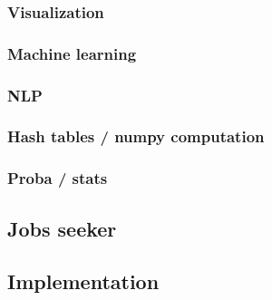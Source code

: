 \documentclass[11pt]{article}
\begin{document}
\subsubsection{Visualization}
\label{sec:org43c0b10}
\subsubsection{Machine learning}
\label{sec:orgefc3432}
\subsubsection{NLP}
\label{sec:org922ff11}
\subsubsection{Hash tables / numpy computation}
\label{sec:org3afe8b7}
\subsubsection{Proba / stats}
\label{sec:org6ca7150}
\subsection{Jobs seeker}
\label{sec:orgb340d7e}
\subsection{Implementation}
\label{sec:org1a010a2}
\end{document}
